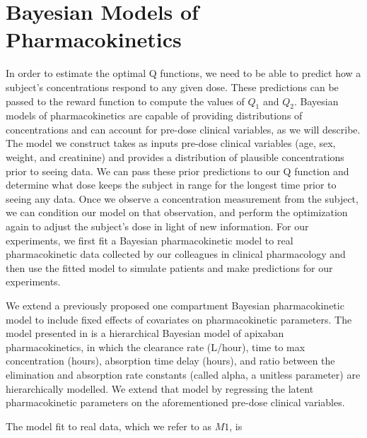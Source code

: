 \section{Bayesian Models of Pharmacokinetics}

In order to estimate the optimal Q functions, we need to be able to predict how a subject’s concentrations respond to any given dose.  These predictions can be passed to the reward function to compute the values of $ Q_1 $ and $ Q_2 $. Bayesian models of pharmacokinetics are capable of providing distributions of concentrations and can account for pre-dose clinical variables, as we will describe.  The model we construct takes as inputs pre-dose clinical variables (age, sex, weight, and creatinine) and provides a distribution of plausible concentrations prior to seeing data.  We can pass these prior predictions to our Q function and determine what dose keeps the subject in range for the longest time prior to seeing any data.  Once we observe a concentration measurement from the subject, we can condition our model on that observation, and perform the optimization again to adjust the subject’s dose in light of new information.   For our experiments, we first fit a Bayesian pharmacokinetic model to real pharmacokinetic data collected by our colleagues in clinical pharmacology \cite{tirona2018apixaban} and then use the fitted model to simulate patients and make predictions for our experiments.

We extend a previously proposed one compartment Bayesian pharmacokinetic model \cite{pananos2020comparisons} to include fixed effects of covariates on pharmacokinetic parameters.  The model presented in \cite{pananos2020comparisons} is a hierarchical Bayesian model of apixaban pharmacokinetics, in which the clearance rate (L/hour), time to max concentration (hours), absorption time delay (hours), and ratio between the elimination and absorption rate constants (called alpha, a unitless parameter) are hierarchically modelled.  We extend that model by regressing the latent pharmacokinetic parameters on the aforementioned pre-dose clinical variables.

The model fit to real data, which we refer to as $ M1 $, is 

